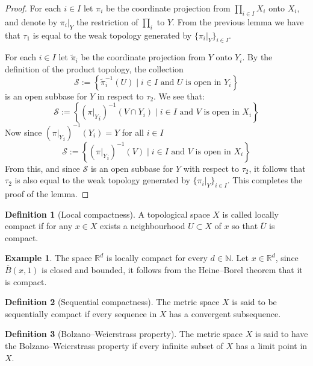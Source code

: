 \documentclass[11pt,a4paper]{article}
\theoremstyle{definition}
\newtheorem{definition}{Definition}[section]
\newtheorem{example}{Example}[section]
\theoremstyle{plain}
\newcommand{\N}{\mathbb{N}}
\newcommand{\R}{\mathbb{R}}
\newcommand{\set}[2]{ \left\{ #1 \mid #2 \right\} }
\begin{document}
  \begin{proof}
    For each $i \in I$ let $\pi_i$ be the coordinate projection from 
    $\prod_{i \in I}{X_i}$ onto $X_i$, and denote by $\pi_i\vert_Y$ the 
    restriction of $\prod_i$ to $Y$. From the previous lemma we have
    that $\tau_1$ is equal to the weak topology generated by 
    $\{\pi_i \vert_Y\}_{i \in I}$. 
    
    For each $i \in I$ let $\tilde{\pi}_i$ be the coordinate projection from 
    $Y$ onto $Y_i$. By the definition of the product topology, the collection
    \[
      \mathcal{S} := \set{\tilde{\pi}_{i}^{-1}(U)}
      {\text{$i \in I$ and $U$ is open in $Y_i$}}
    \]
    is an open subbase for $Y$ in respect to $\tau_2$. We see that:
    \[
      \mathcal{S} := \set{({\pi \vert_Y}_{i})^{-1}(V \cap Y_i)}
      {\text{$i \in I$ and $V$ is open in $X_i$}}
    \]
    Now since $({\pi \vert_Y}_{i})^{-1}(Y_i) = Y$ for all $i \in I$
    \[
      \mathcal{S} := \set{({\pi \vert_Y}_{i})^{-1}(V)}
      {\text{$i \in I$ and $V$ is open in $X_i$}}
    \]
    From this, and since $\mathcal{S}$ is an open subbase for $Y$ with 
    respect to $\tau_2$, it follows that $\tau_2$ is also equal to the weak 
    topology generated by $\{\pi_i \vert_Y\}_{i \in I}$. This completes the
    proof of the lemma.
  \end{proof}

  \begin{definition}[Local compactness]
    A topological space $X$ is called locally compact if for
    any $x \in X$ exists a neighbourhood $U \subset X$ of $x$ so that
    $\overline{U}$ is compact.
  \end{definition}

  \begin{example}
    The space $\R^d$ is locally compact for every $d \in \N$. 
    Let $x \in \R^d$, since $\overline B(x,1)$ is closed and bounded,
    it follows from the Heine--Borel theorem that it is compact.
  \end{example}
  
  \begin{definition}[Sequential compactness]
    The metric space $X$ is said to be sequentially compact
    if every sequence in $X$ has a convergent subsequence.
  \end{definition}

  \begin{definition}[Bolzano--Weierstrass property]
    The metric space $X$ is said to have the 
    Bolzano--Weierstrass property if every infinite subset of 
    $X$ has a limit point in $X$.
  \end{definition}
\end{document}
